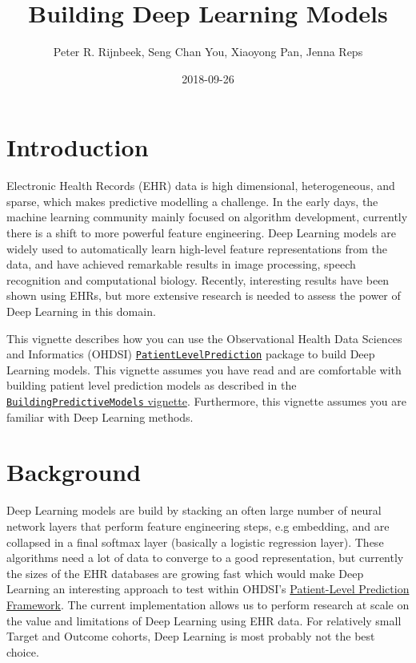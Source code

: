 \documentclass[]{article}
\title{Building Deep Learning Models}
\author{Peter R. Rijnbeek, Seng Chan You, Xiaoyong Pan, Jenna Reps}
\date{2018-09-26}
\begin{document}
\maketitle

{
\setcounter{tocdepth}{2}
\tableofcontents
}
\section{Introduction}\label{introduction}

Electronic Health Records (EHR) data is high dimensional, heterogeneous,
and sparse, which makes predictive modelling a challenge. In the early
days, the machine learning community mainly focused on algorithm
development, currently there is a shift to more powerful feature
engineering. Deep Learning models are widely used to automatically learn
high-level feature representations from the data, and have achieved
remarkable results in image processing, speech recognition and
computational biology. Recently, interesting results have been shown
using EHRs, but more extensive research is needed to assess the power of
Deep Learning in this domain.

This vignette describes how you can use the Observational Health Data
Sciences and Informatics (OHDSI)
\href{http://github.com/OHDSI/PatientLevelPrediction}{\texttt{PatientLevelPrediction}}
package to build Deep Learning models. This vignette assumes you have
read and are comfortable with building patient level prediction models
as described in the
\href{https://github.com/OHDSI/PatientLevelPrediction/blob/master/inst/doc/BuildingPredictiveModels.pdf}{\texttt{BuildingPredictiveModels}
vignette}. Furthermore, this vignette assumes you are familiar with Deep
Learning methods.

\section{Background}\label{background}

Deep Learning models are build by stacking an often large number of
neural network layers that perform feature engineering steps, e.g
embedding, and are collapsed in a final softmax layer (basically a
logistic regression layer). These algorithms need a lot of data to
converge to a good representation, but currently the sizes of the EHR
databases are growing fast which would make Deep Learning an interesting
approach to test within OHDSI's
\href{https://academic.oup.com/jamia/article/25/8/969/4989437}{Patient-Level
Prediction Framework}. The current implementation allows us to perform
research at scale on the value and limitations of Deep Learning using
EHR data. For relatively small Target and Outcome cohorts, Deep Learning
is most probably not the best choice.
\end{document}
